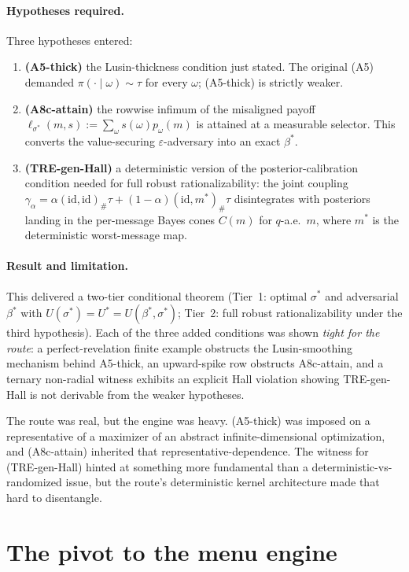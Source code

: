 \documentclass[11pt]{article}
\theoremstyle{definition}
\theoremstyle{remark}
\newcommand{\eps}{\varepsilon}
\begin{document}
\paragraph{Hypotheses required.}
Three hypotheses entered:
\begin{enumerate}[leftmargin=2em]
\item \textbf{(A5-thick)} the Lusin-thickness condition just stated.
The original (A5) demanded $\pi(\cdot\mid\omega)\sim\tau$ for every
$\omega$; (A5-thick) is strictly weaker.
\item \textbf{(A8c-attain)} the rowwise infimum of the misaligned
payoff $\ell_{\sigma^*}(m,s) := \sum_\omega s(\omega) p_\omega(m)$ is
attained at a measurable selector. This converts the value-securing
$\eps$-adversary into an exact $\beta^*$.
\item \textbf{(TRE-gen-Hall)} a deterministic version of the
posterior-calibration condition needed for full robust
rationalizability: the joint coupling
$\gamma_\alpha = \alpha(\mathrm{id},\mathrm{id})_\#\tau + (1-\alpha)(\mathrm{id},m^*)_\#\tau$
disintegrates with posteriors landing in the per-message Bayes cones
$C(m)$ for $q$-a.e.\ $m$, where $m^*$ is the deterministic worst-message map.
\end{enumerate}

\paragraph{Result and limitation.}
This delivered a two-tier conditional theorem (Tier~1: optimal
$\sigma^*$ and adversarial $\beta^*$ with $U(\sigma^*) = U^* =
U(\beta^*,\sigma^*)$; Tier~2: full robust rationalizability under
the third hypothesis). Each of the three added conditions was shown
\emph{tight for the route}: a perfect-revelation finite example
obstructs the Lusin-smoothing mechanism behind A5-thick, an
upward-spike row obstructs A8c-attain, and a ternary non-radial
witness exhibits an explicit Hall violation showing TRE-gen-Hall is
not derivable from the weaker hypotheses.

The route was real, but the engine was heavy. (A5-thick) was
imposed on a representative of a maximizer of an abstract
infinite-dimensional optimization, and (A8c-attain) inherited that
representative-dependence. The witness for (TRE-gen-Hall) hinted at
something more fundamental than a deterministic-vs-randomized issue,
but the route's deterministic kernel architecture made that hard to
disentangle.

\section{The pivot to the menu engine}\label{sec:pivot}
\end{document}
